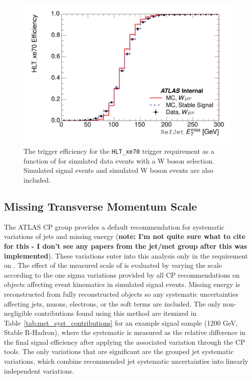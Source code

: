 \begin{figure}[h]
\centering
\includegraphics[width=\fullfig]{figures/hlt_xe70_calomet.png}
\caption{The trigger efficiency for the \texttt{HLT\_xe70} trigger requirement as a function of \calomet for simulated data events with a W boson selection. Simulated signal events and simulated W boson events are also included.}
\label{fig:trigger_turnon_calo}
\end{figure}

\subsection{Missing Transverse Momentum Scale}

The ATLAS \ac{CP} group provides a default recommendation for systematic variations of jets and missing energy (\textbf{note: I'm not quite sure what to cite for this - I don't see any papers from the jet/met group after this was implemented}). These variations enter into this analysis only in the requirement on \met. The effect of the measured scale of \met is evaluated by varying the \met scale according to the one sigma variations provided by all \ac{CP} recommendations on objects affecting event kinematics in simulated signal events. Missing energy is reconstructed from fully reconstructed objects so any systematic uncertainties affecting jets, muons, electrons, or the \met soft terms are included. The only non-negligible contributions found using this method are itemized in Table~\ref{tab:met_syst_contributions} for an example signal sample (1200 GeV, Stable R-Hadron), where the systematic is measured as the relative difference in the final signal efficiency after applying the associated variation through the CP tools. The only variations that are significant are the grouped jet systematic variations, which combine recommended jet systematic uncertainties into linearly independent variations. 

